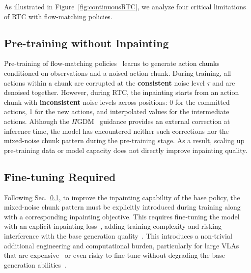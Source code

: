 \documentclass{article}
\begin{document}
As illustrated in Figure~\ref{fig:continuousRTC}, we analyze four critical limitations of RTC with flow-matching policies.

\subsection{Pre-training without Inpainting}
\label{sec:lim_pretrain}
Pre-training of flow-matching policies~\citep{lipman2022flow} learns to generate action chunks conditioned on observations and a noised action chunk.
During training, all actions within a chunk are corrupted at the \textbf{consistent} noise level $\tau$ and are denoised together.
However, during RTC, the inpainting starts from an action chunk with \textbf{inconsistent} noise levels across positions: 0 for the committed actions, 1 for the new actions, and interpolated values for the intermediate actions.
Although the $\Pi$GDM~\citep{song2023pseudoinverse} guidance provides an external correction at inference time, the model has encountered neither such corrections nor the mixed-noise chunk pattern during the pre-training stage.
As a result, scaling up pre-training data or model capacity does not directly improve inpainting quality.

\subsection{Fine-tuning Required}
\label{sec:lim_finetuning}
Following Sec.~\ref{sec:lim_pretrain}, to improve the inpainting capability of the base policy, the mixed-noise chunk pattern must be explicitly introduced during training along with a corresponding inpainting objective.
This requires fine-tuning the model with an explicit inpainting loss~\citep{black2025training}, adding training complexity and risking interference with the base generation quality~\citep{wang2026real}.
This introduces a non-trivial additional engineering and computational burden, particularly for large VLAs that are expensive~\citep{hu2022lora} or even risky to fine-tune without degrading the base generation abilities~\citep{wang2026real}.
\end{document}
